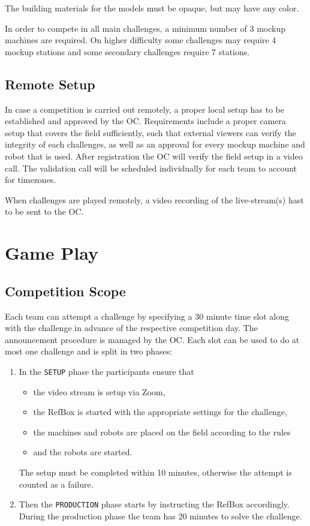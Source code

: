 \documentclass[12pt,twoside]{article}
\begin{document}
The building materials for the models must be opaque, but may have any color.

In order to compete in all main challenges, a minimum number of 3 mockup
machines are required. On higher difficulty some challenges may require
4 mockup stations and some secondary challenges require 7 stations.

\subsection{Remote Setup}
In case a competition is carried out remotely, a proper local setup has to
be established and approved by the \ac{OC}.
Requirements include a proper camera setup that covers the field sufficiently,
such that external viewers can verify the integrity of each challenges,
as well as an approval for every mockup machine and robot that is used.
After registration the \ac{OC} will verify the field setup in a video call.
The validation call will be scheduled individually for each team
to account for timezones.

When challenges are played remotely, a video recording of the live-stream(s)
hast to be sent to the OC.

\section{Game Play}
\subsection{Competition Scope}
Each team can attempt a challenge by specifying a 30 minute time slot along
with the challenge in advance of the respective competition day.
The announcement procedure is managed by the \ac{OC}.
Each slot can be used to do at most one challenge and is split in two phases:
\begin{enumerate}
	\item In the \texttt{SETUP} phase the participants ensure that
\begin{itemize}
	\item the video stream is setup via Zoom,
	\item the RefBox is started with the appropriate settings for the challenge,
	\item the machines and robots are placed on the field according to the rules
	\item and the robots are started.
\end{itemize}
The setup must be completed within 10 minutes, otherwise the attempt is counted
as a failure.
	\item Then the \texttt{PRODUCTION} phase starts by instructing the RefBox
		accordingly. During the production phase the team has 20 minutes to solve
		the challenge.
\end{enumerate}
\end{document}
